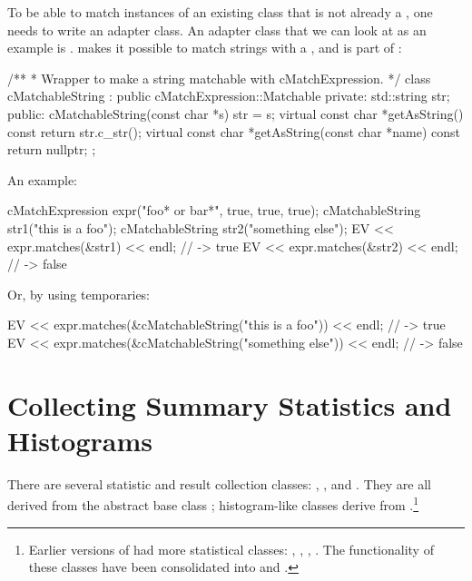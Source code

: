 To be able to match instances of an existing class that is not already a
, one needs to write an adapter class. An adapter class that
we can look at as an example is . 
makes it possible to match strings with a , and is part
of {\opp}:

\begin{cpp}
/**
 * Wrapper to make a string matchable with cMatchExpression.
 */
class cMatchableString : public cMatchExpression::Matchable
{
  private:
    std::string str;
  public:
    cMatchableString(const char *s) {str = s;}
    virtual const char *getAsString() const {return str.c_str();}
    virtual const char *getAsString(const char *name) const {return nullptr;}
};
\end{cpp}

An example:

\begin{cpp}
cMatchExpression expr("foo* or bar*", true, true, true);
cMatchableString str1("this is a foo");
cMatchableString str2("something else");
EV << expr.matches(&str1) << endl; // -> true
EV << expr.matches(&str2) << endl; // -> false
\end{cpp}

Or, by using temporaries:

\begin{cpp}
EV << expr.matches(&cMatchableString("this is a foo")) << endl; // -> true
EV << expr.matches(&cMatchableString("something else")) << endl; // -> false
\end{cpp}


\section{Collecting Summary Statistics and Histograms}
\label{sec:sim-lib:statistics}

There are several statistic and result collection classes:
, ,  and
. They are all derived from the abstract base class
; histogram-like classes derive from
.\footnote{Earlier versions of {\opp} had more
statistical classes: , ,
, . The functionality
of these classes have been consolidated into  and
.}


